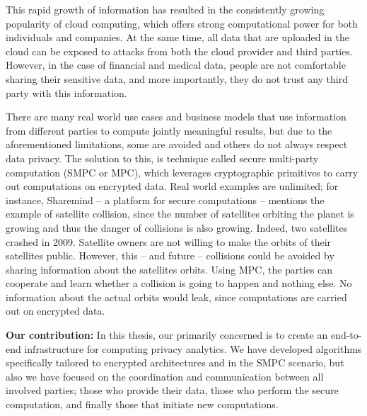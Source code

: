 

This rapid growth of information has resulted in the consistently growing popularity of cloud computing, which offers strong computational power for both individuals and companies.
At the same time, all data that are uploaded in the cloud can be exposed to attacks from both the cloud provider and third parties.
However, in the case of financial and medical data, people are not comfortable sharing their sensitive data, and more importantly, they do not trust any third party with this information.

There are many real world use cases and business models that use information from different parties to compute jointly meaningful results, but due to the aforementioned limitations, some are avoided and others do not always respect data privacy.
The solution to this, is technique called secure multi-party computation (SMPC or MPC), which leverages cryptographic primitives to carry out computations on encrypted data.
Real world examples are unlimited; for instance, Sharemind -- a platform for secure computations -- mentions the example of satellite collision, since the number of satellites orbiting the planet is growing and thus the danger of collisions is also growing.
Indeed, two satellites crashed in 2009.
Satellite owners are not willing to make the orbits of their satellites public.
However, this -- and future -- collisions could be avoided by sharing information about the satellites orbits.
Using MPC, the parties can cooperate and learn whether a collision is going to happen and nothing else.
No information about the actual orbits would leak, since computations are carried out on encrypted data.



\textbf{Our contribution:} In this thesis, our primarily concerned is to create an end-to-end infrastructure for computing privacy analytics.
We have developed algorithms specifically tailored to encrypted architectures and in the SMPC scenario, but also we have focused on the coordination and communication between all involved parties; those who provide their data, those who perform the secure computation, and finally those that initiate new computations.



